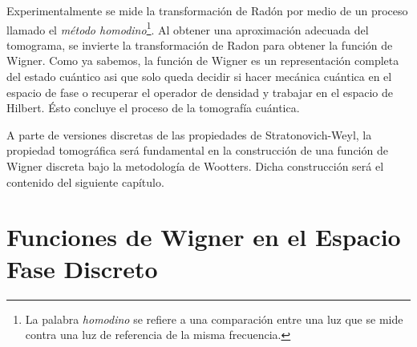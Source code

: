 \documentclass[a4paper]{report}
\begin{document}
  Experimentalmente se mide la transformación de Radón por
  medio de un proceso llamado el \textit{método
    homodino}\footnote{La palabra \textit{homodino} se
  refiere a una comparación entre una luz que se mide contra
  una luz de referencia de la misma frecuencia.}. Al
  obtener una aproximación adecuada del tomograma, se
  invierte la transformación de Radon para obtener la
  función de Wigner.  Como ya sabemos, la función de Wigner
  es un representación completa del estado cuántico asi que
  solo queda decidir si hacer mecánica cuántica en el
  espacio de fase o recuperar el operador de densidad y
  trabajar en el espacio de Hilbert. Ésto concluye el
  proceso de la tomografía cuántica.
  
  A parte de versiones discretas de las propiedades de
  Stratonovich-Weyl, la propiedad tomográfica será
  fundamental en la construcción de una función de Wigner
  discreta bajo la metodología de Wootters. Dicha
  construcción será el contenido del siguiente capítulo.

  \chapter{Funciones de Wigner en el Espacio Fase Discreto}

\end{document}
